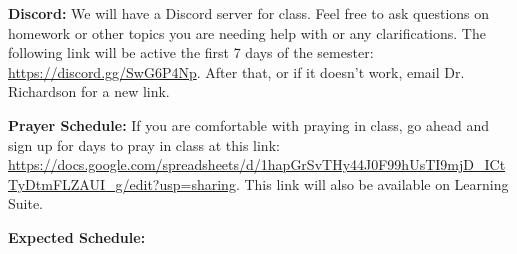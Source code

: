 \documentclass[12pt]{article}
\begin{document}
\textbf{ Discord:} We will have a Discord server for class. Feel free to ask questions on homework or other topics you are needing help with or any clarifications. The following link will be active the first 7 days of the semester: \url{https://discord.gg/SwG6P4Np}. After that, or if it doesn't work, email Dr. Richardson for a new link. 

\vspace{.5 cm}


\textbf{ Prayer Schedule:} If you are comfortable with praying in class, go ahead and sign up for days to pray in class at this link: \url{https://docs.google.com/spreadsheets/d/1hapGrSvTHy44J0F99hUsTI9mjD_ICtTyDtmFLZAUI_g/edit?usp=sharing}. This link will also be available on Learning Suite. 

%


\vspace{.5 cm}

\textbf{Expected Schedule:}
\end{document}
